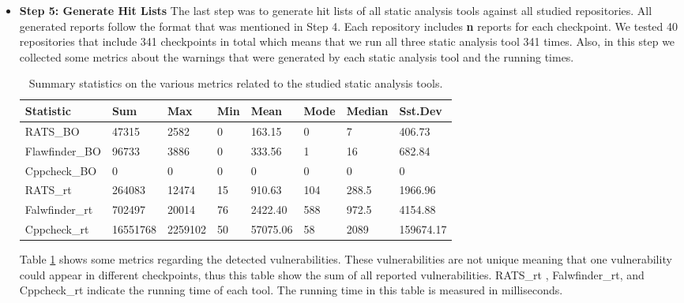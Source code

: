 \begin{itemize}[leftmargin=*]
 \item \textbf{ Step 5: Generate Hit Lists}
The last step was to generate hit lists of all static analysis tools against all studied repositories. All generated reports follow the format that was mentioned in Step 4.  Each repository includes \textbf{n} reports for each checkpoint.  We tested 40 repositories that include 341 checkpoints in total which means that we run all three static analysis tool 341 times. Also, in this step we collected some metrics about the warnings that were generated by each static analysis tool and the running times.
\begin{table}[ht]
\centering
\scriptsize
\caption{Summary statistics on the various metrics related to the studied static analysis tools.}
\label{SAT}
\begin{tabular}{||p{1.4cm}|p{.8cm} p{.7cm} p{.2cm} p{.7cm} p{.2cm} p{.5cm} p{.9cm}||}
\hline
\textbf{Statistic} & \textbf{Sum} & \textbf{Max} &	 \textbf{Min} 	& \textbf{Mean} 	&	 \textbf{Mode} 	& \textbf{Median} 	&  \textbf{Sst.Dev}\\
\hline\hline
RATS\_BO  & 47315 & 2582 &	0&	163.15	&0	&7&	406.73 \\
Flawfinder\_BO &96733 &3886 &	0 &	333.56 &	1	&16	&682.84 \\
Cppcheck\_BO &0 & 0	&0&	0	&0	&0	&0 \\

RATS\_rt & 264083 &12474&	15	&910.63&	104&	288.5	&1966.96\\

Falwfinder\_rt & 702497 &20014	&76&	2422.40&	588	&972.5&	4154.88 \\
Cppcheck\_rt &16551768 &2259102&	50	&57075.06&	58&	2089&	159674.17\\

\hline


\end{tabular}
\end{table}

Table \ref{SAT} shows some metrics regarding the detected vulnerabilities. These vulnerabilities are not unique meaning that one vulnerability could appear in different checkpoints, thus this table show the sum of all reported vulnerabilities. 
RATS\_rt , Falwfinder\_rt, and Cppcheck\_rt indicate the running time of each tool.  The running time in this table is measured in milliseconds. 





\end{itemize} 



